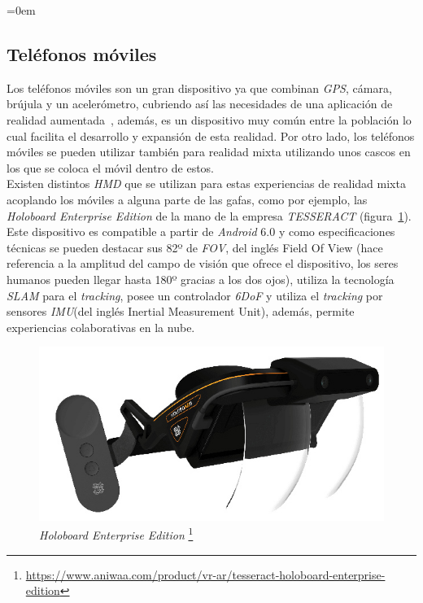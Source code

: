 \parindent=0em
\subsection{Teléfonos móviles}
\noindent


Los teléfonos móviles son un gran dispositivo ya que combinan \textit{GPS}, cámara, brújula y un acelerómetro, cubriendo así las necesidades de una aplicación de realidad aumentada~\cite{arsmartphones}, además, es un dispositivo muy común entre la población lo cual facilita el desarrollo y expansión de esta realidad. Por otro lado, los teléfonos móviles se pueden utilizar también para realidad mixta utilizando unos cascos en los que se coloca el móvil dentro de estos.\\

Existen distintos \textit{HMD} que se utilizan para estas experiencias de realidad mixta acoplando los móviles a alguna parte de las gafas, como por ejemplo, las \textit{Holoboard Enterprise Edition} de la mano de la empresa \textit{TESSERACT} (figura~\ref{fig:mrandroidTESSERACT}). Este dispositivo es compatible a partir de \textit{Android} 6.0  y como especificaciones técnicas se pueden destacar sus 82º de \textit{FOV}, del inglés Field Of View (hace referencia a la amplitud del campo de visión que ofrece el dispositivo, los seres humanos pueden llegar hasta 180º gracias a los dos ojos), utiliza la tecnología \textit{SLAM} para el \textit{tracking}, posee un controlador \textit{6DoF} y utiliza el \textit{tracking} por sensores \textit{IMU}(del inglés Inertial Measurement Unit), además, permite experiencias colaborativas en la nube.

\begin{figure}[H]
    \centering
    \includegraphics[scale=0.4]{Images/Estado del arte/mrandroid.jpg}
    \caption{
    \textit{Holoboard Enterprise Edition}
    \protect\footnote{\url{https://www.aniwaa.com/product/vr-ar/tesseract-holoboard-enterprise-edition}}
    }
    \label{fig:mrandroidTESSERACT}
\end{figure}

